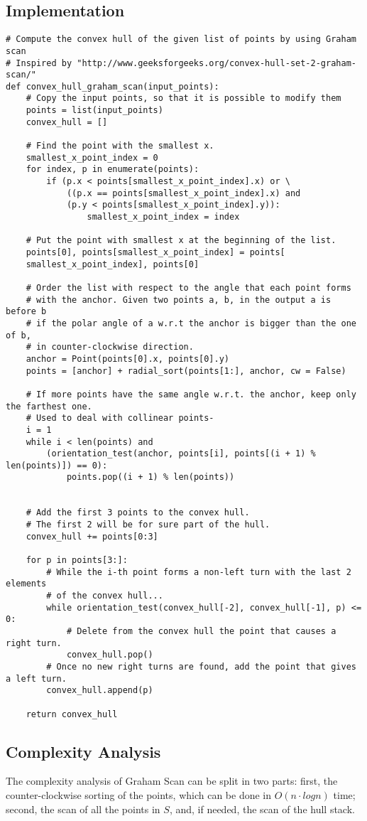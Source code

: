 \documentclass[
12pt,
a4paper,
oneside,
headinclude,
footinclude]{report}
\theoremstyle{definition} %
\begin{document}
\subsection{Implementation}
\begin{verbatim}
# Compute the convex hull of the given list of points by using Graham scan
# Inspired by "http://www.geeksforgeeks.org/convex-hull-set-2-graham-scan/"
def convex_hull_graham_scan(input_points):
	# Copy the input points, so that it is possible to modify them
	points = list(input_points)
	convex_hull = []
	
	# Find the point with the smallest x.
	smallest_x_point_index = 0
	for index, p in enumerate(points):
		if (p.x < points[smallest_x_point_index].x) or \
			((p.x == points[smallest_x_point_index].x) and
			(p.y < points[smallest_x_point_index].y)):
				smallest_x_point_index = index
	
	# Put the point with smallest x at the beginning of the list.
	points[0], points[smallest_x_point_index] = points[
	smallest_x_point_index], points[0]
	
	# Order the list with respect to the angle that each point forms 
	# with the anchor. Given two points a, b, in the output a is before b
	# if the polar angle of a w.r.t the anchor is bigger than the one of b,
	# in counter-clockwise direction.
	anchor = Point(points[0].x, points[0].y)
	points = [anchor] + radial_sort(points[1:], anchor, cw = False)
	
	# If more points have the same angle w.r.t. the anchor, keep only the farthest one.
	# Used to deal with collinear points-
	i = 1
	while i < len(points) and 
		(orientation_test(anchor, points[i], points[(i + 1) % len(points)]) == 0):
			points.pop((i + 1) % len(points))
	
	
	# Add the first 3 points to the convex hull.
	# The first 2 will be for sure part of the hull.
	convex_hull += points[0:3]
	
	for p in points[3:]:
		# While the i-th point forms a non-left turn with the last 2 elements 
		# of the convex hull...
		while orientation_test(convex_hull[-2], convex_hull[-1], p) <= 0:
			# Delete from the convex hull the point that causes a right turn.
			convex_hull.pop()
		# Once no new right turns are found, add the point that gives a left turn.   
		convex_hull.append(p)
	
	return convex_hull
\end{verbatim}


\subsection{Complexity Analysis}
The complexity analysis of Graham Scan can be split in two parts:
first, the counter-clockwise sorting of the points, which can be done in $O(n\cdot log n)$ time; second, the scan of all the points in $S$, and, if needed, the scan of the hull stack.\\
 
\end{document}

